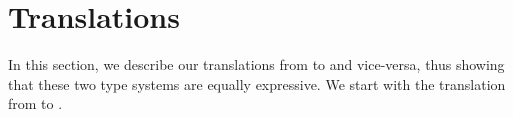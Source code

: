 \section{Translations}
\label{sec:trans}

In this section, we describe our translations from {\fg} to {\cg} and
vice-versa, thus showing that these two type systems are equally
expressive. We start with the translation from {\fg} to {\cg}.









%



